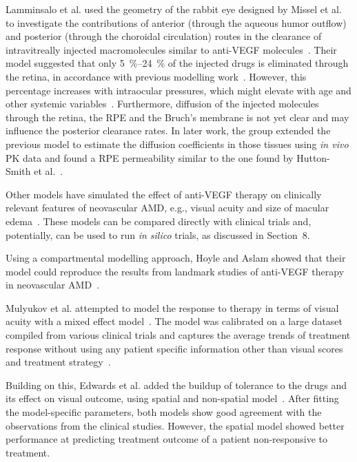 \documentclass[12pt,a4paper]{journal}
\begin{document}
Lamminsalo et al. used the geometry of the rabbit eye designed by Missel et al. to investigate the contributions of anterior (through the aqueous humor outflow) and posterior (through the choroidal circulation) routes in the clearance of intravitreally injected macromolecules similar to anti-VEGF molecules~\cite{Lamminsalo_2018}.
Their model suggested that only \SIrange[range-units = single]{5}{24}{\percent} of the injected drugs is eliminated through the retina, in accordance with previous modelling work~\cite{HuttonSmith_2017}.
However, this percentage increases with intraocular pressures, which might elevate with age and other systemic variables~\cite{Armaly_1967,Hashemi_2005}.
Furthermore, diffusion of the injected molecules through the retina, the RPE and the Bruch's membrane is not yet clear and may influence the posterior clearance rates.
In later work, the group extended the previous model to estimate the diffusion coefficients in those tissues using \textit{in vivo} PK data and found a RPE permeability similar to the one found by Hutton-Smith et al.~\cite{Lamminsalo_2020,HuttonSmith_2017}.

Other models have simulated the effect of anti-VEGF therapy on clinically relevant features of neovascular AMD, e.g., visual acuity and size of macular edema~\cite{Edwards_2020, Hoyle_2017, Mulyukov_2018}.
These models can be compared directly with clinical trials and, potentially, can be used to run \textit{in silico} trials, as discussed in Section~8. %

Using a compartmental modelling approach, Hoyle and Aslam showed that their model could reproduce the results from landmark studies of anti-VEGF therapy in neovascular AMD~\cite{Hoyle_2017}.

Mulyukov et al. attempted to model the response to therapy in terms of visual acuity with a mixed effect model~\cite{Mulyukov_2018}.
The model was calibrated on a large dataset compiled from various clinical trials and captures the average trends of treatment response without using any patient specific information other than visual scores and treatment strategy~\cite{Mulyukov_2018}.

Building on this, Edwards et al. added the buildup of tolerance to the drugs and its effect on visual outcome, using spatial and non-spatial model~\cite{Edwards_2020}.
After fitting the model-specific parameters, both models show good agreement with the observations from the clinical studies.
However, the spatial model showed better performance at predicting treatment outcome of a patient non-responsive to treatment.



\end{document}
